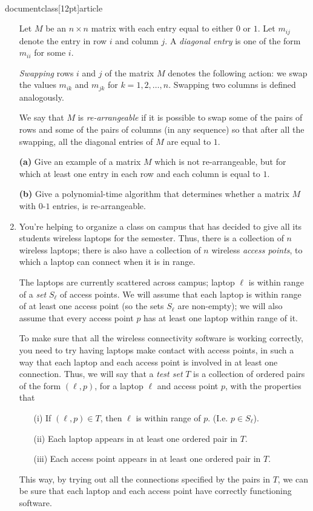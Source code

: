 \\documentclass[12pt]{article}
\begin{document}
\begin{enumerate}
Let $M$ be an $n \times n$ matrix with each entry equal to
either $0$ or $1$.
Let $m_{ij}$ denote the entry in row $i$ and column $j$.
A {\em diagonal entry} is one of the form $m_{ii}$ for some $i$.

{\em Swapping} rows $i$ and $j$ of the matrix $M$ denotes
the following action:
we swap the values $m_{ik}$ and $m_{jk}$ for $k = 1, 2, \ldots, n$.
Swapping two columns is defined analogously.

We say that $M$ is {\em re-arrangeable} if it is possible
to swap some of the pairs of rows and some of the pairs of
columns (in any sequence) so that after all the swapping,
all the diagonal entries of $M$ are equal to $1$.

{\bf (a)} 
Give an example of a matrix $M$ which is not re-arrangeable,
but for which at least one entry in each row and each column
is equal to $1$.

{\bf (b)} 
Give a polynomial-time algorithm that determines 
whether a matrix $M$ with $0$-$1$ entries,
is re-arrangeable.


\item 

You're helping to organize a class on campus that
has decided to give all its students wireless laptops for the semester.
Thus, there is a collection of $n$ wireless laptops;
there is also have a collection of $n$ wireless {\em access points},
to which a laptop can connect when it is in range.

The laptops are currently scattered across campus;
laptop $\ell$ is within range of a {\em set} $S_\ell$ of access points.
We will assume that each laptop is within range of at least
one access point (so the sets $S_\ell$ are non-empty);
we will also assume that every access point $p$ has at least
one laptop within range of it.

To make sure that all the wireless connectivity software is
working correctly, you need to try having laptops
make contact with access points, in such a way that
each laptop and each access point is involved in at least one connection.
Thus, we will say that a {\em test set} $T$ is a collection
of ordered pairs of the form $(\ell,p)$, for a laptop $\ell$
and access point $p$, with the properties that
\begin{itemize}
\item[(i)] If $(\ell,p) \in T$, then $\ell$ is within range of
$p$.  (I.e. $p \in S_\ell$).
\item[(ii)] Each laptop appears in at least one ordered pair in $T$.
\item[(iii)] Each access point appears in at least one ordered pair in $T$.
\end{itemize}
This way, by trying out all the connections specified by the pairs in $T$,
we can be sure that each laptop and each access point
have correctly functioning software.


\end{enumerate}
\end{document}
